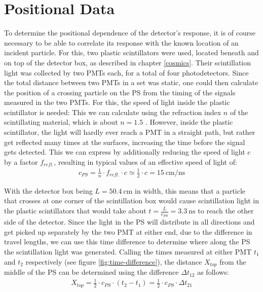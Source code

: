 

\section{Positional Data}\label{sec:positional-data}

    To determine the positional dependence of the detector's response, it is of course necessary to be able to correlate its response with the known location of an incident particle.
	For this, two plastic scintillators were used, located beneath and on top of the detector box, as described in chapter \ref{cosmics}.
	Their scintillation light was collected by two \acsp{PMT} each, for a total of four photodetectors.
	Since the total distance between two \acsp{PMT} in a set was static, one could then calculate the position of a crossing particle on the \ac{PS} from the timing of the signals measured in the two \acsp{PMT}.
	For this, the speed of light inside the plastic scintillator is needed: This we can calculate using the refraction index $n$ of the scintillating material, which is about $n = 1.5$ \cite{ZACHARIAS}. However, inside the plastic scintillator, the light will hardly ever reach a \ac{PMT} in a straight path, but rather get reflected many times at the surfaces, increasing the time before the signal gets detected. This we can express by additionally reducing the speed of light $c$ by a factor $f_{refl.}$, resulting in typical values of an effective speed of light of:
	\begin{align}
	    c_{PS} = \frac{1}{n} \cdot f_{refl.} \cdot c \simeq \frac{1}{2} \cdot c = \SI{15}{\centi\meter\per\nano\second}
	\end{align}
	
	With the detector box being $L = \SI{50.4}{\centi\meter}$ in width, this means that a particle that crosses at one corner of the scintillation box would cause scintillation light in the plastic scintillators that would take about $t = \frac{L}{c_{PS}} = \SI{3.3}{\nano\second}$ to reach the other side of the detector.
	Since the light in the \ac{PS} will distribute in all directions and get picked up separately by the two \ac{PMT} at either end, due to the difference in travel lengths, we can use this time difference to determine where along the \ac{PS} the scintillation light was generated.
	Calling the times measured at either \ac{PMT} $t_1$ and $t_2$ respectively (see figure \ref{fig:time-difference}), the distance $X_{top}$ from the middle of the \ac{PS} can be determined using the difference $\Delta t_{12}$ as follows:
	\begin{align}
	    X_{top} = \frac{1}{2} \cdot c_{PS} \cdot (t_2 - t_1) = \frac{1}{2} \cdot c_{PS} \cdot \Delta t_{21}
	    \label{eq:timing}
	\end{align}
	
